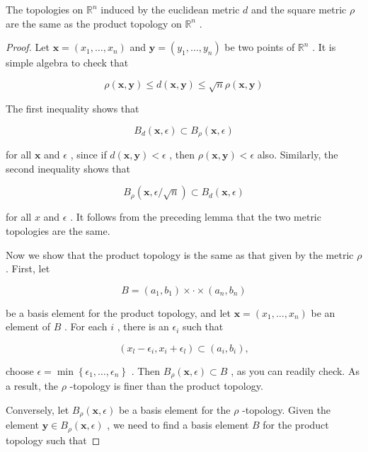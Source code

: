\begin{theorem} The topologies on \({\mathbb{R}}^{n}\) induced by the euclidean metric \(d\) and the square metric \(\rho\) are the same as the product topology on \({\mathbb{R}}^{n}\) .

\end{theorem}
\begin{proof}
Let \(\mathbf{x} = \left( {{x}_{1},\ldots ,{x}_{n}}\right)\) and \(\mathbf{y} = \left( {{y}_{1},\ldots ,{y}_{n}}\right)\) be two points of \({\mathbb{R}}^{n}\) . It is simple algebra to check that

\[
\rho \left( {\mathbf{x},\mathbf{y}}\right)  \leq  d\left( {\mathbf{x},\mathbf{y}}\right)  \leq  \sqrt{n}\rho \left( {\mathbf{x},\mathbf{y}}\right)
\]

The first inequality shows that

\[
{B}_{d}\left( {\mathbf{x},\epsilon }\right)  \subset  {B}_{\rho }\left( {\mathbf{x},\epsilon }\right)
\]

for all \(\mathbf{x}\) and \(\epsilon\) , since if \(d\left( {\mathbf{x},\mathbf{y}}\right)  < \epsilon\) , then \(\rho \left( {\mathbf{x},\mathbf{y}}\right)  < \epsilon\) also. Similarly, the second inequality shows that

\[
{B}_{\rho }\left( {\mathbf{x},\epsilon /\sqrt{n}}\right)  \subset  {B}_{d}\left( {\mathbf{x},\epsilon }\right)
\]

for all \(x\) and \(\epsilon\) . It follows from the preceding lemma that the two metric topologies are the same.

Now we show that the product topology is the same as that given by the metric \(\rho\) . First, let

\[
B = \left( {{a}_{1},{b}_{1}}\right)  \times   \cdot   \times  \left( {{a}_{n},{b}_{n}}\right)
\]

be a basis element for the product topology, and let \(\mathbf{x} = \left( {{x}_{1},\ldots ,{x}_{n}}\right)\) be an element of \(B\) . For each \(i\) , there is an \({\epsilon }_{i}\) such that

\[
\left( {{x}_{l} - {\epsilon }_{i},{x}_{i} + {\epsilon }_{l}}\right)  \subset  \left( {{a}_{i},{b}_{i}}\right) ,
\]

choose \(\epsilon  = \min \left\{  {{\epsilon }_{1},\ldots ,{\epsilon }_{n}}\right\}\) . Then \({B}_{\rho }\left( {\mathbf{x},\epsilon }\right)  \subset  B\) , as you can readily check. As a result, the \(\rho\) -topology is finer than the product topology.

Conversely, let \({B}_{\rho }\left( {\mathbf{x},\epsilon }\right)\) be a basis element for the \(\rho\) -topology. Given the element \(\mathbf{y} \in  {B}_{\rho }\left( {\mathbf{x},\epsilon }\right)\) , we need to find a basis element \(B\) for the product topology such that


\end{proof}
